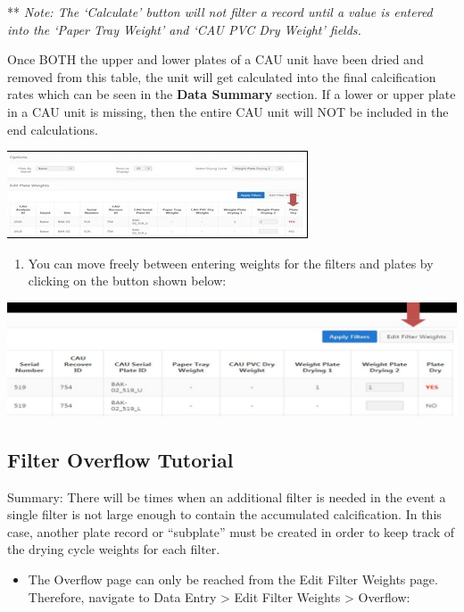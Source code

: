 \documentclass[
]{book}
\providecommand{\tightlist}{%
  \setlength{\itemsep}{0pt}\setlength{\parskip}{0pt}}
\begin{document}
** \emph{Note: The `Calculate' button will not filter a record until a value is entered into the `Paper Tray Weight' and `CAU PVC Dry Weight' fields.}

Once BOTH the upper and lower plates of a CAU unit have been dried and removed from this table, the unit will get calculated into the final calcification rates which can be seen in the \textbf{Data Summary} section. If a lower or upper plate in a CAU unit is missing, then the entire CAU unit will NOT be included in the end calculations.

\includegraphics{images/Data14.jpg}

\begin{enumerate}
\def\labelenumi{\arabic{enumi}.}
\setcounter{enumi}{7}
\tightlist
\item
  You can move freely between entering weights for the filters and plates by clicking on the button shown below:
\end{enumerate}

\includegraphics{images/Data15.jpg}

\hypertarget{filter-overflow-tutorial}{%
\subsection{Filter Overflow Tutorial}\label{filter-overflow-tutorial}}

Summary: There will be times when an additional filter is needed in the event a single filter is not large enough to contain the accumulated calcification. In this case, another plate record or ``subplate'' must be created in order to keep track of the drying cycle weights for each filter.

\begin{itemize}
\tightlist
\item
  The Overflow page can only be reached from the Edit Filter Weights page. Therefore, navigate to Data Entry \textgreater{} Edit Filter Weights \textgreater{} Overflow:
\end{itemize}
\end{document}
